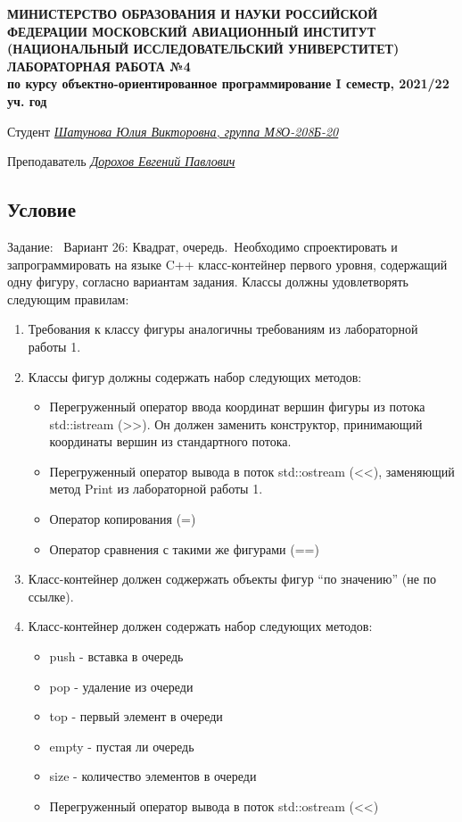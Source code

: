 \documentclass[12pt]{article}
\begin{document}
\begin{titlepage}
\begin{center}
\textbf{МИНИСТЕРСТВО ОБРАЗОВАНИЯ И НАУКИ РОССИЙСКОЙ ФЕДЕРАЦИИ
\medskip
МОСКОВСКИЙ АВИАЦИОННЫЙ ИНСТИТУТ
(НАЦИОНАЛЬНЫЙ ИССЛЕДОВАТЕЛЬСКИЙ УНИВЕРСТИТЕТ)
\vfill\vfill
{\Huge ЛАБОРАТОРНАЯ РАБОТА №4} \\
по курсу объектно-ориентированное программирование
I семестр, 2021/22 уч. год}
\end{center}
\vfill

Студент \uline{\it {Шатунова Юлия Викторовна, группа М8О-208Б-20}\hfill}

Преподаватель \uline{\it {Дорохов Евгений Павлович}\hfill}

\vfill
\end{titlepage}

\subsection*{Условие}

Задание: \
Вариант 26: Квадрат, очередь.\
Необходимо спроектировать и запрограммировать на языке C++ класс-контейнер первого уровня, содержащий одну фигуру, согласно вариантам задания. Классы должны удовлетворять следующим правилам:
\begin{enumerate}
\item Требования к классу фигуры аналогичны требованиям из лабораторной работы 1.
\item Классы фигур должны содержать набор следующих методов:
\begin{itemize}
    \item Перегруженный оператор ввода координат вершин фигуры из потока std::istream (>>). Он должен заменить конструктор, принимающий координаты вершин из стандартного потока.
    \item Перегруженный оператор вывода в поток std::ostream (<<), заменяющий метод Print из лабораторной работы 1. 
    \item Оператор копирования (=)
    \item Оператор сравнения с такими же фигурами (==)
\end{itemize}
\item Класс-контейнер должен соджержать объекты фигур “по значению” (не по ссылке).
\item Класс-контейнер должен содержать набор следующих методов:
\begin{itemize}
	\item push - вставка в очередь
	\item pop - удаление из очереди
	\item top - первый элемент в очереди
	\item empty - пустая ли очередь
	\item size - количество элементов в очереди
	\item Перегруженный оператор вывода в поток std::ostream (<<)
\end{itemize}
\end{enumerate}
\end{document}

